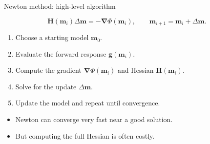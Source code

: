 \documentclass[aspectratio=169]{beamer}
\newcommand{\mat}[1]{{\mathbf{#1}}}
\renewcommand{\vec}[1]{\mathbf{#1}}
\newcommand{\mm}{ {\vec{m}} }
\newcommand{\delm}{ {\Delta\mm} }
\renewcommand{\gg}[1]{\vec{g}\left(#1\right)}
\begin{document}
\begin{frame}{Newton method: high-level algorithm}
\small

\[
\mat{H}(\mm_i)\delm = -\bm{\nabla}\Phi(\mm_i),
\qquad
\mm_{i+1}=\mm_i+\delm.
\]

{
\vspace{0.15cm}
\begin{enumerate}
    \item[--] Choose a starting model $\mm_0$.
    \item[--] Evaluate the forward response $\gg{\mm_i}$.
    \item[--] Compute the gradient $\bm{\nabla}\Phi(\mm_i)$ and Hessian $\mat{H}(\mm_i)$.
    \item[--] Solve for the update $\delm$.
    \item[--] Update the model and repeat until convergence.
\end{enumerate}

\vspace{0.05cm}
\begin{itemize}
    \item[--] Newton can converge very fast near a good solution.
    \item[--] But computing the full Hessian is often costly.
\end{itemize}
}
\end{frame}
\end{document}
